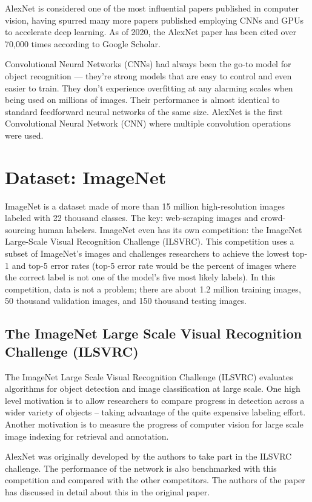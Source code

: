 \documentclass[11pt]{report}
\begin{document}
AlexNet is considered one of the most influential papers published in computer vision, having spurred many more papers published employing CNNs and GPUs to accelerate deep learning. As of 2020, the AlexNet paper has been cited over 70,000 times according to Google Scholar. \citep{one}

 Convolutional Neural Networks (CNNs) had always been the go-to model for object recognition — they’re strong models that are easy to control and even easier to train. They don’t experience overfitting at any alarming scales when being used on millions of images. Their performance is almost identical to standard feedforward neural networks of the same size. AlexNet is the first Convolutional Neural Network (CNN) where multiple convolution
operations were used.
 
\section{Dataset: ImageNet}
 ImageNet is a dataset made of more than 15 million high-resolution images labeled with 22 thousand classes. The key: web-scraping images and crowd-sourcing human labelers. ImageNet even has its own competition: the ImageNet Large-Scale Visual Recognition Challenge (ILSVRC). This competition uses a subset of ImageNet’s images and challenges researchers to achieve the lowest top-1 and top-5 error rates (top-5 error rate would be the percent of images where the correct label is not one of the model’s five most likely labels). In this competition, data is not a problem; there are about 1.2 million training images, 50 thousand validation images, and 150 thousand testing images.
 
\subsection{The ImageNet Large Scale Visual Recognition Challenge (ILSVRC)} \label{ilsvrc}
The ImageNet Large Scale Visual Recognition Challenge (ILSVRC) evaluates algorithms for object detection and image classification at large scale. One high level motivation is to allow researchers to compare progress in detection across a wider variety of objects -- taking advantage of the quite expensive labeling effort. Another motivation is to measure the progress of computer vision for large scale image indexing for retrieval and annotation.

AlexNet was originally developed by the authors to take part in the ILSVRC challenge. The performance of the network is also benchmarked with this competition and compared with the other competitors. The authors of the paper has discussed in detail about this in the original paper. \citep{one}
\end{document}
